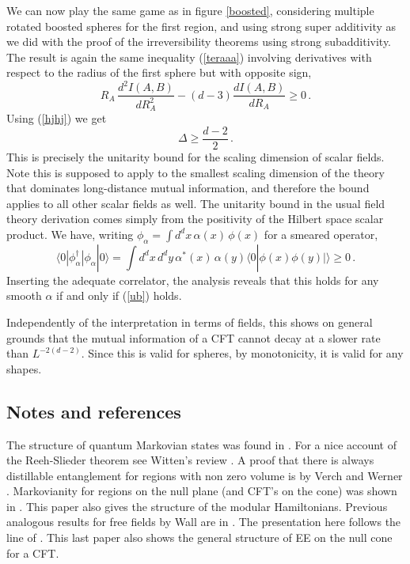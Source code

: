 \documentclass[12pt]{article}
\numberwithin{equation}{section}
\newcommand{\be}{\begin{equation}}
\newcommand{\ee}{\end{equation}}
\begin{document}
We can now play the same game as in figure \ref{boosted}, considering multiple rotated boosted spheres for the first region, and using strong super additivity as we did with the proof of the irreversibility theorems using strong subadditivity. The result is again the same inequality (\ref{teraaa}) involving derivatives with respect to the radius of the first sphere but with opposite sign,
\be
R_A\, \frac{d^2 I(A,B)}{dR_A^2} -(d-3) \frac{d I(A,B)}{dR_A}\ge 0\,.
\ee
Using (\ref{hjhj}) we get
\be
\Delta \ge \frac{d-2}{2}\,.\label{ub}
\ee
This is precisely the unitarity bound for the scaling dimension of scalar fields. Note this is supposed to apply to the smallest scaling dimension of the theory that dominates long-distance mutual information, and therefore the bound applies to all other scalar fields as well. The unitarity bound in the usual field theory derivation comes simply from the positivity of the Hilbert space scalar product. We have, writing $\phi_\alpha=\int d^d x\, \alpha(x)\, \phi(x)$ for a smeared operator,
\be 
\langle 0|\phi_\alpha^\dagger | \phi_\alpha |0\rangle= \int d^d x\, d^d y\, \alpha^*(x)\,\alpha(y) \langle 0|\phi(x)\phi(y)|\rangle \ge 0\,.
\ee
Inserting the adequate correlator, the analysis reveals that this holds for any smooth $\alpha$ if and only if (\ref{ub}) holds.

Independently of the interpretation in terms of fields, this shows on general grounds that the mutual information of a CFT cannot decay at a slower rate than $L^{-2(d-2)}$. Since this is valid for spheres, by monotonicity, it is valid for any shapes.

\subsection{Notes and references}
The structure of quantum Markovian states was found in \cite{hayden2004structure}. For a nice account of the Reeh-Slieder theorem see Witten's review \cite{Witten:2018lha}. A proof that there is always distillable entanglement for regions with non zero volume is by Verch and Werner \cite{verch2005distillability}. Markovianity for regions on the null plane (and CFT's on the cone) was shown in \cite{Casini:2017roe}. This paper also gives the structure of the modular Hamiltonians. Previous analogous results for free fields by Wall are in \cite{Wall:2011hj}. The presentation here follows the line of \cite{Casini:2018kzx}. This last paper also shows the general structure of EE on the null cone for a CFT. 
\end{document}
